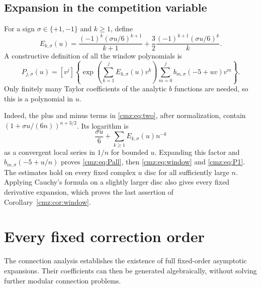 \documentclass[11pt,letterpaper]{article}
\numberwithin{equation}{section}
\theoremstyle{definition}\newtheorem{definition}[theorem]{Definition}
\theoremstyle{remark}\newtheorem{remark}[theorem]{Remark}
\begin{document}
\subsection{Expansion in the competition variable}
For a sign $\sigma\in\{+1,-1\}$ and $k\geq1$, define
\begin{equation}
E_{k,\sigma}(u)
=\frac{(-1)^k(\sigma u/6)^{k+1}}{k+1}
 +\frac32\frac{(-1)^{k+1}(\sigma u/6)^k}{k}.
\label{cmz:eq:Ek}
\end{equation}
A constructive definition of all the window polynomials is
\begin{equation}
P_{j,\sigma}(u)=
[v^j]\left\{
\exp\!\left(\sum_{k=1}^j E_{k,\sigma}(u)v^k\right)
\sum_{m=0}^j b_{m,\sigma}(-5+uv)v^m\right\}.
\label{cmz:eq:Pall}
\end{equation}
Only finitely many Taylor coefficients of the analytic $b$ functions are needed, so this is a polynomial in $u$.

Indeed, the plus and minus terms in \eqref{cmz:eq:two}, after normalization, contain $(1+\sigma u/(6n))^{n+3/2}$. Its logarithm is
\[
\frac{\sigma u}{6}+\sum_{k\geq1}E_{k,\sigma}(u)n^{-k}
\]
as a convergent local series in $1/n$ for bounded $u$. Expanding this factor and $b_{m,\sigma}(-5+u/n)$ proves \eqref{cmz:eq:Pall}, then \eqref{cmz:eq:window} and \eqref{cmz:eq:P1}. The estimates hold on every fixed complex $u$ disc for all sufficiently large $n$. Applying Cauchy's formula on a slightly larger disc also gives every fixed derivative expansion, which proves the last assertion of Corollary~\ref{cmz:cor:window}.

\section{Every fixed correction order}
\label{cmz:sec:corrections}
The connection analysis establishes the existence of full fixed-order asymptotic expansions. Their coefficients can then be generated algebraically, without solving further modular connection problems.
\end{document}
